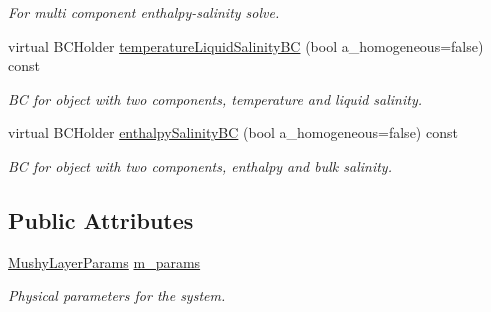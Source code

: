 \begin{DoxyCompactItemize}
\begin{DoxyCompactList}\small\item\em For multi component enthalpy-\/salinity solve. \end{DoxyCompactList}\item 
\hypertarget{class_phys_b_c_util_ac2d93df710bd85569c3e943f46db6803}{virtual B\-C\-Holder \hyperlink{class_phys_b_c_util_ac2d93df710bd85569c3e943f46db6803}{temperature\-Liquid\-Salinity\-B\-C} (bool a\-\_\-homogeneous=false) const }\label{class_phys_b_c_util_ac2d93df710bd85569c3e943f46db6803}

\begin{DoxyCompactList}\small\item\em B\-C for object with two components, temperature and liquid salinity. \end{DoxyCompactList}\item 
\hypertarget{class_phys_b_c_util_ab852d537da8e31d294949510ce547c48}{virtual B\-C\-Holder \hyperlink{class_phys_b_c_util_ab852d537da8e31d294949510ce547c48}{enthalpy\-Salinity\-B\-C} (bool a\-\_\-homogeneous=false) const }\label{class_phys_b_c_util_ab852d537da8e31d294949510ce547c48}

\begin{DoxyCompactList}\small\item\em B\-C for object with two components, enthalpy and bulk salinity. \end{DoxyCompactList}\end{DoxyCompactItemize}
\subsection*{Public Attributes}
\begin{DoxyCompactItemize}
\item 
\hypertarget{class_phys_b_c_util_a1007b24a131e788c97781df04ae9037e}{\hyperlink{class_mushy_layer_params}{Mushy\-Layer\-Params} \hyperlink{class_phys_b_c_util_a1007b24a131e788c97781df04ae9037e}{m\-\_\-params}}\label{class_phys_b_c_util_a1007b24a131e788c97781df04ae9037e}

\begin{DoxyCompactList}\small\item\em Physical parameters for the system. \end{DoxyCompactList}\end{DoxyCompactItemize}
